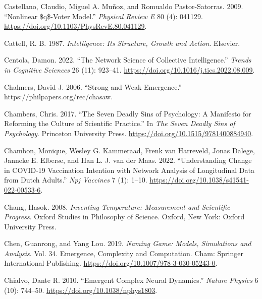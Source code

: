\documentclass[
  a4paper,
  DIV=11,
  numbers=noendperiod,
  oneside]{scrreprt}
\newlength{\cslhangindent}
\newlength{\cslentryspacingunit} %
\newenvironment{CSLReferences}[2] %
 {%
  \setlength{\parindent}{0pt}
  \ifodd #1
  \let\oldpar\par
  \def\par{\hangindent=\cslhangindent\oldpar}
  \fi
  \setlength{\parskip}{#2\cslentryspacingunit}
 }%
 {}
\begin{document}
\begin{CSLReferences}{1}{0}
\leavevmode{}%
Castellano, Claudio, Miguel A. Muñoz, and Romualdo Pastor-Satorras.
2009. {``Nonlinear \$q\$-Voter Model.''} \emph{Physical Review E} 80
(4): 041129. \url{https://doi.org/10.1103/PhysRevE.80.041129}.

\leavevmode{}%
Cattell, R. B. 1987. \emph{Intelligence: {Its Structure}, {Growth} and
{Action}}. {Elsevier}.

\leavevmode{}%
Centola, Damon. 2022. {``The Network Science of Collective
Intelligence.''} \emph{Trends in Cognitive Sciences} 26 (11): 923--41.
\url{https://doi.org/10.1016/j.tics.2022.08.009}.

\leavevmode{}%
Chalmers, David J. 2006. {``Strong and Weak Emergence.''}
https://philpapers.org/rec/chasaw.

\leavevmode{}%
Chambers, Chris. 2017. {``The {Seven Deadly Sins} of {Psychology}: {A
Manifesto} for {Reforming} the {Culture} of {Scientific Practice}.''} In
\emph{The {Seven Deadly Sins} of {Psychology}}. {Princeton University
Press}. \url{https://doi.org/10.1515/9781400884940}.

\leavevmode{}%
Chambon, Monique, Wesley G. Kammeraad, Frenk van Harreveld, Jonas
Dalege, Janneke E. Elberse, and Han L. J. van der Maas. 2022.
{``Understanding Change in {COVID-19} Vaccination Intention with Network
Analysis of Longitudinal Data from {Dutch} Adults.''} \emph{Npj
Vaccines} 7 (1): 1--10.
\url{https://doi.org/10.1038/s41541-022-00533-6}.

\leavevmode{}%
Chang, Hasok. 2008. \emph{Inventing {Temperature}: {Measurement} and
{Scientific Progress}}. Oxford {Studies} in {Philosophy} of {Science}.
{Oxford, New York}: {Oxford University Press}.

\leavevmode{}%
Chen, Guanrong, and Yang Lou. 2019. \emph{Naming {Game}: {Models},
{Simulations} and {Analysis}}. Vol. 34. Emergence, {Complexity} and
{Computation}. {Cham}: {Springer International Publishing}.
\url{https://doi.org/10.1007/978-3-030-05243-0}.

\leavevmode{}%
Chialvo, Dante R. 2010. {``Emergent Complex Neural Dynamics.''}
\emph{Nature Physics} 6 (10): 744--50.
\url{https://doi.org/10.1038/nphys1803}.


\end{CSLReferences}
\end{document}
